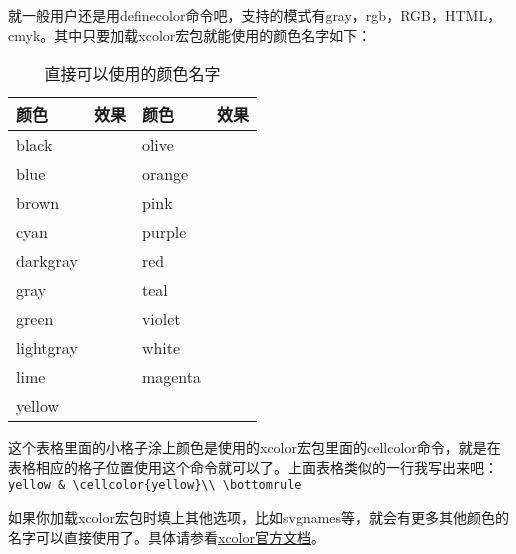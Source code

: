\documentclass[11pt,oneside]{book}
\begin{document}
  就一般用户还是用definecolor命令吧，支持的模式有gray，rgb，RGB，HTML，cmyk。其中只要加载xcolor宏包就能使用的颜色名字如下：
  \begin{table}[H]
    \centering
    \begin{tabular}{@{}lp{50pt}lp{50pt}@{}}
      \toprule
      颜色        & 效果  & 颜色       & 效果\\ \midrule
      black     &  \cellcolor{black}  & olive     &    \cellcolor{olive} \\
      blue      &   \cellcolor{blue} & orange    &   \cellcolor{orange}\\
      brown     &  \cellcolor{brown}  & pink      &   \cellcolor{pink}\\
      cyan      &   \cellcolor{cyan} & purple    &   \cellcolor{purple}\\
      darkgray  &  \cellcolor{darkgray} &red       &   \cellcolor{red}  \\
      gray      &   \cellcolor{gray} & teal      &    \cellcolor{teal}\\
      green     &   \cellcolor{green} & violet    &   \cellcolor{violet}\\
      lightgray &  \cellcolor{lightgray} &white     &   \cellcolor{white} \\
      lime      &    \cellcolor{lime} & magenta   &   \cellcolor{magenta} \\
      yellow    &    \cellcolor{yellow}\\ \bottomrule
    \end{tabular}
    \label{tab:直接可以使用的颜色名字}
    \caption{直接可以使用的颜色名字}
  \end{table}
  这个表格里面的小格子涂上颜色是使用的xcolor宏包里面的cellcolor命令，就是在表格相应的格子位置使用这个命令就可以了。上面表格类似的一行我写出来吧：\\
  \verb+yellow & \cellcolor{yellow}\\ \bottomrule+

  如果你加载xcolor宏包时填上其他选项，比如svgnames等，就会有更多其他颜色的名字可以直接使用了。具体请参看\href{http://mirrors.ctan.org/macros/latex/contrib/xcolor/xcolor.pdf}{xcolor官方文档}。
\end{document}
